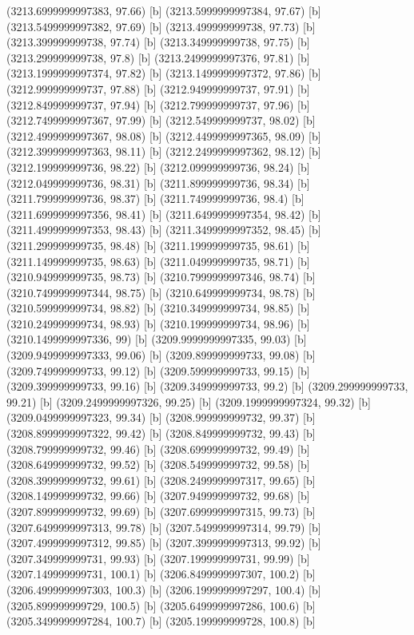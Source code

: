{{{(3213.6999999997383, 97.66) [b] 
(3213.5999999997384, 97.67) [b] 
(3213.5499999997382, 97.69) [b] 
(3213.499999999738, 97.73) [b] 
(3213.399999999738, 97.74) [b] 
(3213.349999999738, 97.75) [b] 
(3213.299999999738, 97.8) [b] 
(3213.2499999997376, 97.81) [b] 
(3213.1999999997374, 97.82) [b] 
(3213.1499999997372, 97.86) [b] 
(3212.999999999737, 97.88) [b] 
(3212.949999999737, 97.91) [b] 
(3212.849999999737, 97.94) [b] 
(3212.799999999737, 97.96) [b] 
(3212.7499999997367, 97.99) [b] 
(3212.549999999737, 98.02) [b] 
(3212.4999999997367, 98.08) [b] 
(3212.4499999997365, 98.09) [b] 
(3212.3999999997363, 98.11) [b] 
(3212.2499999997362, 98.12) [b] 
(3212.199999999736, 98.22) [b] 
(3212.099999999736, 98.24) [b] 
(3212.049999999736, 98.31) [b] 
(3211.899999999736, 98.34) [b] 
(3211.799999999736, 98.37) [b] 
(3211.749999999736, 98.4) [b] 
(3211.6999999997356, 98.41) [b] 
(3211.6499999997354, 98.42) [b] 
(3211.4999999997353, 98.43) [b] 
(3211.3499999997352, 98.45) [b] 
(3211.299999999735, 98.48) [b] 
(3211.199999999735, 98.61) [b] 
(3211.149999999735, 98.63) [b] 
(3211.049999999735, 98.71) [b] 
(3210.949999999735, 98.73) [b] 
(3210.7999999997346, 98.74) [b] 
(3210.7499999997344, 98.75) [b] 
(3210.649999999734, 98.78) [b] 
(3210.599999999734, 98.82) [b] 
(3210.349999999734, 98.85) [b] 
(3210.249999999734, 98.93) [b] 
(3210.199999999734, 98.96) [b] 
(3210.1499999997336, 99) [b] 
(3209.9999999997335, 99.03) [b] 
(3209.9499999997333, 99.06) [b] 
(3209.899999999733, 99.08) [b] 
(3209.749999999733, 99.12) [b] 
(3209.599999999733, 99.15) [b] 
(3209.399999999733, 99.16) [b] 
(3209.349999999733, 99.2) [b] 
(3209.299999999733, 99.21) [b] 
(3209.2499999997326, 99.25) [b] 
(3209.1999999997324, 99.32) [b] 
(3209.0499999997323, 99.34) [b] 
(3208.999999999732, 99.37) [b] 
(3208.8999999997322, 99.42) [b] 
(3208.849999999732, 99.43) [b] 
(3208.799999999732, 99.46) [b] 
(3208.699999999732, 99.49) [b] 
(3208.649999999732, 99.52) [b] 
(3208.549999999732, 99.58) [b] 
(3208.399999999732, 99.61) [b] 
(3208.2499999997317, 99.65) [b] 
(3208.149999999732, 99.66) [b] 
(3207.949999999732, 99.68) [b] 
(3207.899999999732, 99.69) [b] 
(3207.6999999997315, 99.73) [b] 
(3207.6499999997313, 99.78) [b] 
(3207.5499999997314, 99.79) [b] 
(3207.4999999997312, 99.85) [b] 
(3207.3999999997313, 99.92) [b] 
(3207.349999999731, 99.93) [b] 
(3207.199999999731, 99.99) [b] 
(3207.149999999731, 100.1) [b] 
(3206.8499999997307, 100.2) [b] 
(3206.4999999997303, 100.3) [b] 
(3206.1999999997297, 100.4) [b] 
(3205.899999999729, 100.5) [b] 
(3205.6499999997286, 100.6) [b] 
(3205.3499999997284, 100.7) [b] 
(3205.199999999728, 100.8) [b] 
}}}
